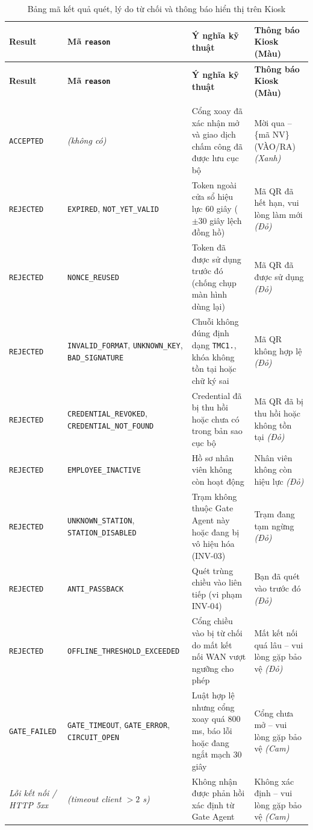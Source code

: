 \small
\begin{longtable}{|>{\raggedright\arraybackslash}p{2.1cm}|>{\raggedright\arraybackslash}p{4.3cm}|>{\raggedright\arraybackslash}p{4.8cm}|>{\raggedright\arraybackslash}p{3.6cm}|}
\caption{Bảng mã kết quả quét, lý do từ chối và thông báo hiển thị trên Kiosk}\label{tab:scan-reject-reasons}\\
\hline
\textbf{Result} & \textbf{Mã \texttt{reason}} & \textbf{Ý nghĩa kỹ thuật} & \textbf{Thông báo Kiosk (Màu)} \\
\hline
\endfirsthead
\hline
\textbf{Result} & \textbf{Mã \texttt{reason}} & \textbf{Ý nghĩa kỹ thuật} & \textbf{Thông báo Kiosk (Màu)} \\
\hline
\endhead
\hline
\multicolumn{4}{r}{\textit{Còn tiếp sang trang sau...}} \\
\hline
\endfoot
\hline
\endlastfoot
\texttt{ACCEPTED} & \textit{(không có)} & Cổng xoay đã xác nhận mở và giao dịch chấm công đã được lưu cục bộ & Mời qua -- \{mã NV\} (VÀO/RA) \textit{(Xanh)} \\
\hline
\texttt{REJECTED} & \texttt{EXPIRED}, \texttt{NOT\_YET\_VALID} & Token ngoài cửa sổ hiệu lực 60 giây ($\pm 30$ giây lệch đồng hồ) & Mã QR đã hết hạn, vui lòng làm mới \textit{(Đỏ)} \\
\hline
\texttt{REJECTED} & \texttt{NONCE\_REUSED} & Token đã được sử dụng trước đó (chống chụp màn hình dùng lại) & Mã QR đã được sử dụng \textit{(Đỏ)} \\
\hline
\texttt{REJECTED} & \texttt{INVALID\_FORMAT}, \texttt{UNKNOWN\_KEY}, \texttt{BAD\_SIGNATURE} & Chuỗi không đúng định dạng \texttt{TMC1.}, khóa không tồn tại hoặc chữ ký sai & Mã QR không hợp lệ \textit{(Đỏ)} \\
\hline
\texttt{REJECTED} & \texttt{CREDENTIAL\_REVOKED}, \texttt{CREDENTIAL\_NOT\_FOUND} & Credential đã bị thu hồi hoặc chưa có trong bản sao cục bộ & Mã QR đã bị thu hồi hoặc không tồn tại \textit{(Đỏ)} \\
\hline
\texttt{REJECTED} & \texttt{EMPLOYEE\_INACTIVE} & Hồ sơ nhân viên không còn hoạt động & Nhân viên không còn hiệu lực \textit{(Đỏ)} \\
\hline
\texttt{REJECTED} & \texttt{UNKNOWN\_STATION}, \texttt{STATION\_DISABLED} & Trạm không thuộc Gate Agent này hoặc đang bị vô hiệu hóa (INV-03) & Trạm đang tạm ngừng \textit{(Đỏ)} \\
\hline
\texttt{REJECTED} & \texttt{ANTI\_PASSBACK} & Quét trùng chiều vào liên tiếp (vi phạm INV-04) & Bạn đã quét vào trước đó \textit{(Đỏ)} \\
\hline
\texttt{REJECTED} & \texttt{OFFLINE\_THRESHOLD\_EXCEEDED} & Cổng chiều vào bị từ chối do mất kết nối WAN vượt ngưỡng cho phép & Mất kết nối quá lâu -- vui lòng gặp bảo vệ \textit{(Đỏ)} \\
\hline
\texttt{GATE\_FAILED} & \texttt{GATE\_TIMEOUT}, \texttt{GATE\_ERROR}, \texttt{CIRCUIT\_OPEN} & Luật hợp lệ nhưng cổng xoay quá 800 ms, báo lỗi hoặc đang ngắt mạch 30 giây & Cổng chưa mở -- vui lòng gặp bảo vệ \textit{(Cam)} \\
\hline
\textit{Lỗi kết nối / HTTP 5xx} & \textit{(timeout client $> 2$ s)} & Không nhận được phản hồi xác định từ Gate Agent & Không xác định -- vui lòng gặp bảo vệ \textit{(Cam)} \\
\hline
\end{longtable}
